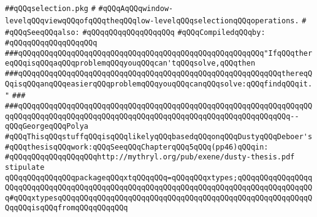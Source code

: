 \label{src/lib/x-kit/xclient/src/window/selection.pkg}
\verb|##qQQqselection.pkg|\newline
\verb|#|\newline
\verb|#qQQqAqQQqwindow-levelqQQqviewqQQqofqQQqtheqQQqlow-levelqQQqselectionqQQqoperations.|\newline
\verb|#|\newline
\verb|#qQQqSeeqQQqalso:|\newline
\verb|#qQQqqQQqqQQqqQQqqQQq|\newline
\newline
\verb|#qQQqCompiledqQQqby:|\newline
\verb|#qQQqqQQqqQQqqQQqqQQq|\newline
\newline
\newline
\newline
\newline
\newline
\newline
\verb|###qQQqqQQqqQQqqQQqqQQqqQQqqQQqqQQqqQQqqQQqqQQqqQQqqQQqqQQq"IfqQQqthereqQQqisqQQqaqQQqproblemqQQqyouqQQqcan'tqQQqsolve,qQQqthen|\newline
\verb|###qQQqqQQqqQQqqQQqqQQqqQQqqQQqqQQqqQQqqQQqqQQqqQQqqQQqqQQqqQQqthereqQQqisqQQqanqQQqeasierqQQqproblemqQQqyouqQQqcanqQQqsolve:qQQqfindqQQqit."|\newline
\verb|###|\newline
\verb|###qQQqqQQqqQQqqQQqqQQqqQQqqQQqqQQqqQQqqQQqqQQqqQQqqQQqqQQqqQQqqQQqqQQqqQQqqQQqqQQqqQQqqQQqqQQqqQQqqQQqqQQqqQQqqQQqqQQqqQQqqQQqqQQqqQQq--qQQqGeorgeqQQqPolya|\newline
\newline
\newline
\verb|#qQQqThisqQQqstuffqQQqisqQQqlikelyqQQqbasedqQQqonqQQqDustyqQQqDeboer's|\newline
\verb|#qQQqthesisqQQqwork:qQQqSeeqQQqChapterqQQq5qQQq(pp46)qQQqin:|\newline
\verb|#qQQqqQQqqQQqqQQqqQQqhttp://mythryl.org/pub/exene/dusty-thesis.pdf|\newline
\newline
\verb|stipulate|\newline
\verb|qQQqqQQqqQQqqQQqpackageqQQqxtqQQqqQQq=qQQqqQQqxtypes;qQQqqQQqqQQqqQQqqQQqqQQqqQQqqQQqqQQqqQQqqQQqqQQqqQQqqQQqqQQqqQQqqQQqqQQqqQQqqQQqqQQqqQQq#qQQqxtypesqQQqqQQqqQQqqQQqqQQqqQQqqQQqqQQqqQQqqQQqqQQqqQQqqQQqqQQqqQQqqQQqisqQQqfromqQQqqQQqqQQq|\newline
